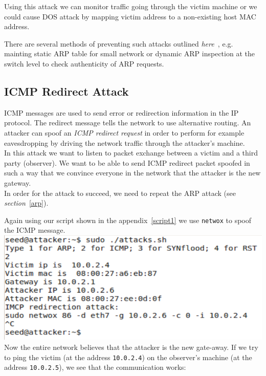 \documentclass[12pt, a4paper, pdflatex]{article}
\begin{document}
Using this attack we can monitor traffic going through the victim machine or we could cause DOS attack by mapping victim address to a non-existing host MAC address.

There are several methods of preventing such attacks outlined \textit{here~\cite{blog}}, e.g. mainting static ARP table for small network or dynamic ARP inspection at the switch level to check authenticity of ARP requests.


\subsection{ICMP Redirect Attack}

ICMP messages are used to send error or redirection information in the IP protocol. The redirect message tells the network to use alternative routing. An attacker can spoof an \emph{ICMP redirect request} in order to perform for example eavesdropping by driving the network traffic through the attacker's machine.\\

In this attack we want to listen to packet exchange between a victim and a third party (observer). We want to be able to send ICMP redirect packet spoofed in such a way that we convince everyone in the network that the attacker is the new gateway.\\

In order for the attack to succeed, we need to repeat the ARP attack (see \emph{section}~\ref{arp}).

Again using our script shown in the appendix~\ref{script1} we use \texttt{netwox} to spoof the ICMP message.\\
\includegraphics[width=.95\textwidth]{gfx/imcp-netwox}\\


Now the entire network believes that the attacker is the new gate-away. If we try to ping the victim (at the address \texttt{10.0.2.4}) on the observer's machine (at the address \texttt{10.0.2.5}), we see that the communication works:\\
\end{document}
